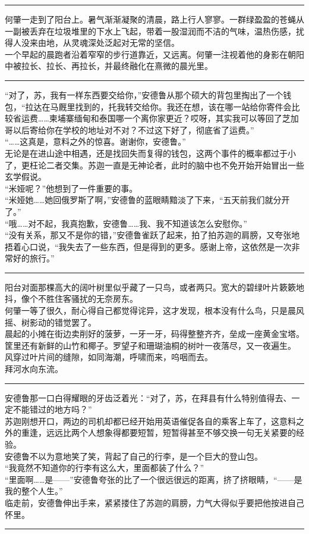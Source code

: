 \documentclass[oneside,11pt]{memoir} %
\begin{document}
\begin{CJK}{UTF8}{gbsn}
\rule{-3pt}{30pt}
     何肇一走到了阳台上。暑气渐渐凝聚的清晨，路上行人寥寥。一群绿盈盈的苍蝇从一副被丢弃在垃圾堆里的下水上飞起，带着一股湿润而不洁的气味，温热伤感，扰得人没来由地，从灵魂深处泛起对无常的坚信。\\\indent
      一个早起的晨跑者沿着窄窄的步行道靠近，又远离。何肇一注视着他的身影在朝阳中被拉长、拉长、再拉长，并最终融化在熹微的晨光里。\\\indent
\rule{-3pt}{30pt}
     “对了，苏，我有一样东西要交给你，”安德鲁从那个硕大的背包里掏出了一个钱包，“拉达在马厩里找到的，托我转交给你。我还在想，该在哪一站给你寄件会比较省运费……柬埔寨缅甸和泰国哪一个离你家更近？哎呀，其实我可以等回了芝加哥以后寄给你在学校的地址对不对？不过这下好了，彻底省了运费。”\\\indent
    “……这真是，意料之外的惊喜。谢谢你，安德鲁。”\\\indent
    无论是在进山途中相遇，还是找回失而复得的钱包，这两个事件的概率都过于小了，更枉论二者交集。苏迦一直是无神论者，此时的脑中也不免开始开始冒出一些玄学假说。\\\indent
     “米娅呢？”他想到了一件重要的事。\\\indent
     “米娅她……她回俄罗斯了啊，”安德鲁的蓝眼睛黯淡了下来，“五天前我们就分开了。”\\\indent
     “哦……对不起，我真抱歉，安德鲁……我、我不知道该怎么安慰你。”\\\indent
     “没有关系，那又不是你的错，”安德鲁雀跃了起来，拍了拍苏迦的肩膀，又夸张地捂着心口说，“我失去了一些东西，但是得到的更多。感谢上帝，这依然是一次非常好的旅行。”\\\indent

\rule{-3pt}{30pt}
    阳台对面那棵高大的阔叶树里似乎藏了一只鸟，或者两只。宽大的碧绿叶片簌簌地抖，像个不胜住客骚扰的无奈房东。\\\indent
    何肇一等了很久，耐心得自己都觉得诧异，这才发现，根本没有什么鸟，只是晨风摇、树影动的错觉罢了。\\\indent
    晨起的小摊在街边卖削好的菠萝，一牙一牙，码得整整齐齐，垒成一座黄金宝塔。筐里还有新鲜的山竹和椰子。罗望子和珊瑚油桐的树叶一夜落尽，又一夜遍生。\\\indent
    风穿过叶片间的缝隙，如同海潮，呼啸而来，呜咽而去。\\\indent
    拜河水向东流。\\\indent
\rule{-3pt}{30pt}

    安德鲁那一口白得耀眼的牙齿泛着光：“对了，苏，在拜县有什么特别值得去、一定不能错过的地方吗？”\\\indent
    苏迦刚想开口，两边的司机却都已经开始用英语催促各自的乘客上车了，这意料之外的重逢，远远比两个人想象得都要短暂，短暂得甚至不够交换一句无关紧要的经验。\\\indent
    安德鲁不以为意地笑了笑，背起了自己的行李，是一个巨大的登山包。\\\indent
    “我竟然不知道你的行李有这么大，里面都装了什么？”\\\indent
    “里面啊……是——”安德鲁夸张的比了一个很远很远的距离，挤了挤眼睛，“——是我的整个人生。”\\\indent
    临走前，安德鲁伸出手来，紧紧搂住了苏迦的肩膀，力气大得似乎要把他按进自己怀里。\\\indent
\rule{-3pt}{30pt}


\end{CJK}
\end{document}

